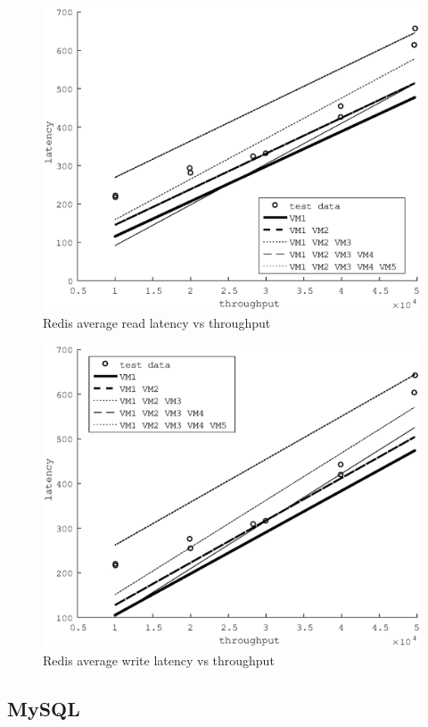 \documentclass{acm_proc_article-sp}
\begin{document}
\begin{figure}
\centering
\includegraphics[scale = 0.5]{redis_read_plot.eps}
\caption{Redis average read latency vs throughput}
\label{figure:redisread}
\end{figure}

\begin{figure}
\centering
\includegraphics[scale = 0.5]{redis_write_plot.eps}
\caption{Redis average write latency vs throughput}
\label{figure:rediswrite}
\end{figure}

\subsection{MySQL}
\end{document}
